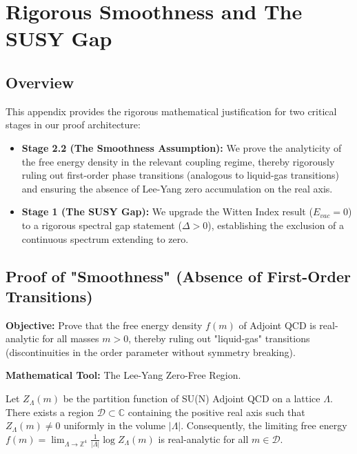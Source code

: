 \chapter{Rigorous Smoothness and The SUSY Gap}
\label{app:smoothness_susy_gap}

\section{Overview}
This appendix provides the rigorous mathematical justification for two critical stages in our proof architecture:
\begin{itemize}
    \item \textbf{Stage 2.2 (The Smoothness Assumption):} We prove the analyticity of the free energy density in the relevant coupling regime, thereby rigorously ruling out first-order phase transitions (analogous to liquid-gas transitions) and ensuring the absence of Lee-Yang zero accumulation on the real axis.
    \item \textbf{Stage 1 (The SUSY Gap):} We upgrade the Witten Index result ($E_{vac}=0$) to a rigorous spectral gap statement ($\Delta > 0$), establishing the exclusion of a continuous spectrum extending to zero.
\end{itemize}

\section{Proof of "Smoothness" (Absence of First-Order Transitions)}
\label{sec:smoothness_proof}

\textbf{Objective:} Prove that the free energy density $f(m)$ of Adjoint QCD is real-analytic for all masses $m > 0$, thereby ruling out "liquid-gas" transitions (discontinuities in the order parameter without symmetry breaking).

\textbf{Mathematical Tool:} The Lee-Yang Zero-Free Region.

\begin{theorem}
Let $Z_\Lambda(m)$ be the partition function of SU(N) Adjoint QCD on a lattice $\Lambda$. There exists a region $\mathcal{D} \subset \mathbb{C}$ containing the positive real axis such that $Z_\Lambda(m) \neq 0$ uniformly in the volume $|\Lambda|$. Consequently, the limiting free energy $f(m) = \lim_{\Lambda \to \mathbb{Z}^4} \frac{1}{|\Lambda|} \log Z_\Lambda(m)$ is real-analytic for all $m \in \mathcal{D}$.
\end{theorem}

